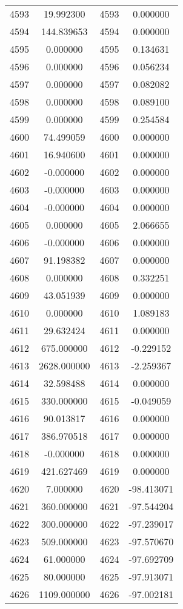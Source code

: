 \documentclass[12pt]{article}
\begin{document}
\begin{longtable}{@{}cccc@{}}
4593 & 19.992300 & 4593 & 0.000000 \\
4594 & 144.839653 & 4594 & 0.000000 \\
4595 & 0.000000 & 4595 & 0.134631 \\
4596 & 0.000000 & 4596 & 0.056234 \\
4597 & 0.000000 & 4597 & 0.082082 \\
4598 & 0.000000 & 4598 & 0.089100 \\
4599 & 0.000000 & 4599 & 0.254584 \\
4600 & 74.499059 & 4600 & 0.000000 \\
4601 & 16.940600 & 4601 & 0.000000 \\
4602 & -0.000000 & 4602 & 0.000000 \\
4603 & -0.000000 & 4603 & 0.000000 \\
4604 & -0.000000 & 4604 & 0.000000 \\
4605 & 0.000000 & 4605 & 2.066655 \\
4606 & -0.000000 & 4606 & 0.000000 \\
4607 & 91.198382 & 4607 & 0.000000 \\
4608 & 0.000000 & 4608 & 0.332251 \\
4609 & 43.051939 & 4609 & 0.000000 \\
4610 & 0.000000 & 4610 & 1.089183 \\
4611 & 29.632424 & 4611 & 0.000000 \\
4612 & 675.000000 & 4612 & -0.229152 \\
4613 & 2628.000000 & 4613 & -2.259367 \\
4614 & 32.598488 & 4614 & 0.000000 \\
4615 & 330.000000 & 4615 & -0.049059 \\
4616 & 90.013817 & 4616 & 0.000000 \\
4617 & 386.970518 & 4617 & 0.000000 \\
4618 & -0.000000 & 4618 & 0.000000 \\
4619 & 421.627469 & 4619 & 0.000000 \\
4620 & 7.000000 & 4620 & -98.413071 \\
4621 & 360.000000 & 4621 & -97.544204 \\
4622 & 300.000000 & 4622 & -97.239017 \\
4623 & 509.000000 & 4623 & -97.570670 \\
4624 & 61.000000 & 4624 & -97.692709 \\
4625 & 80.000000 & 4625 & -97.913071 \\
4626 & 1109.000000 & 4626 & -97.002181 \\

\end{longtable}
\end{document}
